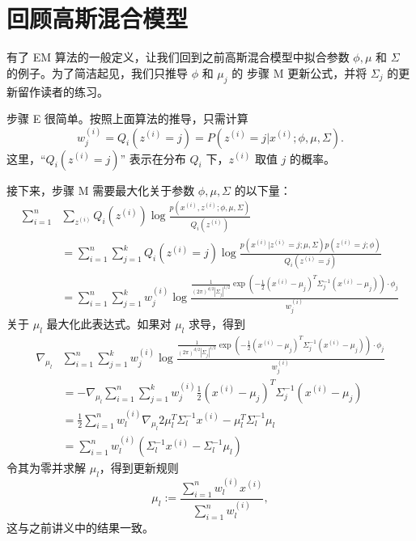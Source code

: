 \section{回顾高斯混合模型}\label{sec:11.4}

有了 EM 算法的一般定义，让我们回到之前高斯混合模型中拟合参数 $\phi, \mu$ 和 $\Sigma$ 的例子。为了简洁起见，我们只推导 $\phi$ 和 $\mu_j$ 的 步骤 M 更新公式，并将 $\Sigma_j$ 的更新留作读者的练习。

步骤 E 很简单。按照上面算法的推导，只需计算
\[
    w_j^{(i)} = Q_i(z^{(i)} = j) = P(z^{(i)} = j|x^{(i)}; \phi, \mu, \Sigma).
\]
这里，“$Q_i(z^{(i)} = j)$” 表示在分布 $Q_i$ 下，$z^{(i)}$ 取值 $j$ 的概率。

接下来，步骤 M 需要最大化关于参数 $\phi, \mu, \Sigma$ 的以下量：
\begin{align*}
    \sum_{i=1}^n &\sum_{z^{(i)}} Q_i(z^{(i)}) \log \frac{p(x^{(i)}, z^{(i)}; \phi, \mu, \Sigma)}{Q_i(z^{(i)})}\\
    &= \sum_{i=1}^n \sum_{j=1}^k Q_i(z^{(i)} = j) \log \frac{p(x^{(i)}|z^{(i)} = j; \mu, \Sigma) p(z^{(i)} = j; \phi)}{Q_i(z^{(i)} = j)} \\
    &= \sum_{i=1}^n \sum_{j=1}^k w_j^{(i)} \log \frac{\frac{1}{(2\pi)^{d/2}|\Sigma_j|^{1/2}} \exp(-\frac{1}{2}(x^{(i)} - \mu_j)^T \Sigma_j^{-1} (x^{(i)} - \mu_j)) \cdot \phi_j}{w_j^{(i)}}
\end{align*}
关于 $\mu_l$ 最大化此表达式。如果对 $\mu_l$ 求导，得到
\begin{align*}
    \nabla_{\mu_l} &\sum_{i=1}^n \sum_{j=1}^k w_j^{(i)} \log \frac{\frac{1}{(2\pi)^{d/2}|\Sigma_j|^{1/2}} \exp(-\frac{1}{2}(x^{(i)} - \mu_j)^T \Sigma_j^{-1} (x^{(i)} - \mu_j)) \cdot \phi_j}{w_j^{(i)}} \\
    &= -\nabla_{\mu_l} \sum_{i=1}^n \sum_{j=1}^k w_j^{(i)} \frac{1}{2} (x^{(i)} - \mu_j)^T \Sigma_j^{-1} (x^{(i)} - \mu_j) \\
    &= \frac{1}{2} \sum_{i=1}^n w_l^{(i)} \nabla_{\mu_l} 2\mu_l^T \Sigma_l^{-1} x^{(i)} - \mu_l^T \Sigma_l^{-1} \mu_l \\
    &= \sum_{i=1}^n w_l^{(i)} (\Sigma_l^{-1} x^{(i)} - \Sigma_l^{-1} \mu_l)
\end{align*}
令其为零并求解 $\mu_l$，得到更新规则
\[
    \mu_l := \frac{\sum_{i=1}^n w_l^{(i)} x^{(i)}}{\sum_{i=1}^n w_l^{(i)}},
\]
这与之前讲义中的结果一致。

